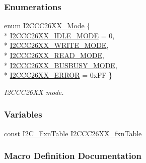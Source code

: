 \subsubsection*{Enumerations}
\begin{DoxyCompactItemize}
\item 
enum \hyperlink{_i2_c_c_c26_x_x_8h_a9deb519e150efd12ccf7068efca5ee75}{I2\+C\+C\+C26\+X\+X\+\_\+\+Mode} \{ \\*
\hyperlink{_i2_c_c_c26_x_x_8h_a9deb519e150efd12ccf7068efca5ee75a60d28fe92b8e810c3384ced9d3704b43}{I2\+C\+C\+C26\+X\+X\+\_\+\+I\+D\+L\+E\+\_\+\+M\+O\+D\+E} = 0, 
\\*
\hyperlink{_i2_c_c_c26_x_x_8h_a9deb519e150efd12ccf7068efca5ee75ace7a8aa7d1f988ee9f646dcf01b52c02}{I2\+C\+C\+C26\+X\+X\+\_\+\+W\+R\+I\+T\+E\+\_\+\+M\+O\+D\+E}, 
\\*
\hyperlink{_i2_c_c_c26_x_x_8h_a9deb519e150efd12ccf7068efca5ee75af55098f438a76add23448ed7e00babed}{I2\+C\+C\+C26\+X\+X\+\_\+\+R\+E\+A\+D\+\_\+\+M\+O\+D\+E}, 
\\*
\hyperlink{_i2_c_c_c26_x_x_8h_a9deb519e150efd12ccf7068efca5ee75a8a3a18aa86be05a8bd1932ee6f10a4b9}{I2\+C\+C\+C26\+X\+X\+\_\+\+B\+U\+S\+B\+U\+S\+Y\+\_\+\+M\+O\+D\+E}, 
\\*
\hyperlink{_i2_c_c_c26_x_x_8h_a9deb519e150efd12ccf7068efca5ee75a2c1e95ab5805dc5184f10f4a01e0e39c}{I2\+C\+C\+C26\+X\+X\+\_\+\+E\+R\+R\+O\+R} = 0x\+F\+F
 \}
\begin{DoxyCompactList}\small\item\em I2\+C\+C\+C26\+X\+X mode. \end{DoxyCompactList}\end{DoxyCompactItemize}
\subsubsection*{Variables}
\begin{DoxyCompactItemize}
\item 
const \hyperlink{struct_i2_c___fxn_table}{I2\+C\+\_\+\+Fxn\+Table} \hyperlink{_i2_c_c_c26_x_x_8h_a6fb66ad0052e9ab9d1c1b65b8276fc61}{I2\+C\+C\+C26\+X\+X\+\_\+fxn\+Table}
\end{DoxyCompactItemize}


\subsubsection{Macro Definition Documentation}
